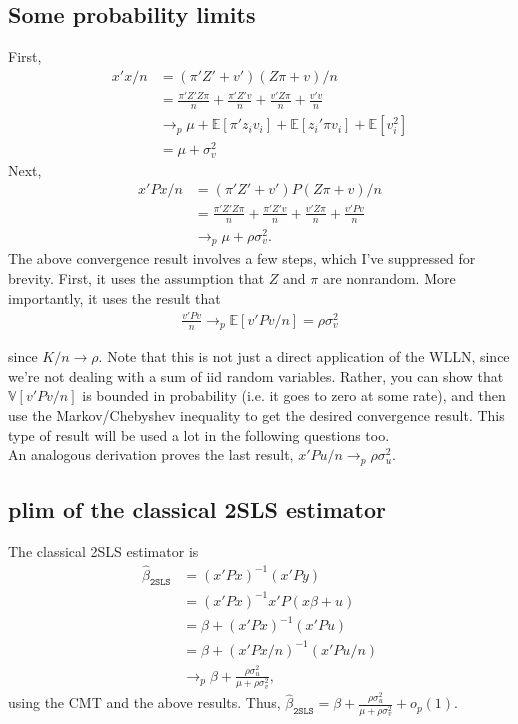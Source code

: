 \documentclass[12pt]{article}
\newcommand{\E}{\mathbb{E}}
\newcommand{\V}{\mathbb{V}}
\newcommand{\mtx}[1]{\ensuremath{\bm{\mathit{#1}}}}
\begin{document}
\subsection{Some probability limits}
First,
\begin{align*}
\mtx{x}'\mtx{x}/n &= (\mtx{\pi}'\mtx{Z}'+\mtx{v}')(\mtx{Z}\mtx{\pi}+\mtx{v})/n\\
&= \frac{\mtx{\pi}'\mtx{Z}'\mtx{Z}\mtx{\pi}}{n} + \frac{\mtx{\pi}'\mtx{Z}'\mtx{v}}{n} + \frac{\mtx{v}'\mtx{Z}\mtx{\pi}}{n} + \frac{\mtx{v}'\mtx{v}}{n}\\
&\to_p \mu + \E[\mtx{\pi}'\mtx{z}_iv_i] + \E[\mtx{z}_i'\mtx{\pi}v_i] + \E[v_i^2]\\
&=\mu + \sigma^2_v
\end{align*}
Next,
\begin{align*}
\mtx{x}'\mtx{P}\mtx{x}/n &= (\mtx{\pi}'\mtx{Z}'+\mtx{v}')\mtx{P}(\mtx{Z}\mtx{\pi}+\mtx{v})/n\\
&=\frac{\mtx{\pi}'\mtx{Z}'\mtx{Z}\mtx{\pi}}{n} + \frac{\mtx{\pi}'\mtx{Z}'\mtx{v}}{n} + \frac{\mtx{v}'\mtx{Z}\mtx{\pi}}{n} + \frac{\mtx{v}'\mtx{P}\mtx{v}}{n}\\
&\to_p \mu + \rho \sigma^2_v.
\end{align*}
The above convergence result involves a few steps, which I've suppressed for brevity. First, it uses the assumption that $\mtx{Z}$ and $\mtx{\pi}$ are nonrandom. More importantly, it uses the result that
\begin{align*}
 \frac{\mtx{v}'\mtx{P}\mtx{v}}{n} \to_p \E[{\mtx{v}'\mtx{P}\mtx{v}}/{n}] = \rho\sigma^2_v
\end{align*} 


since $K/n \to \rho$. Note that this is not just a direct application of the WLLN, since we're not dealing with a sum of iid random variables. Rather, you can show that $\V[{\mtx{v}'\mtx{P}\mtx{v}}/{n}]$ is bounded in probability (i.e. it goes to zero at some rate), and then use the Markov/Chebyshev inequality to get the desired convergence result. This type of result will be used a lot in the following questions too.\\

An analogous derivation proves the last result, $\mtx{x}'\mtx{P}\mtx{u}/n \to_p \rho \sigma^2_u$.

\subsection{plim of the classical 2SLS estimator}
The classical 2SLS estimator is
\begin{align*}
\hat\beta_{\texttt{2SLS}} &= (\mtx{x}'\mtx{P}\mtx{x})^{-1}(\mtx{x}'\mtx{P}\mtx{y})\\
&= (\mtx{x}'\mtx{P}\mtx{x})^{-1}\mtx{x}'\mtx{P}(\mtx{x}\mtx{\beta} + \mtx{u})\\
&= \beta + (\mtx{x}'\mtx{P}\mtx{x})^{-1}(\mtx{x}'\mtx{P}\mtx{u})\\
&= \beta + (\mtx{x}'\mtx{P}\mtx{x}/n)^{-1}(\mtx{x}'\mtx{P}\mtx{u}/n)\\
&\to_p \beta + \frac{\rho\sigma^2_u}{ \mu + \rho \sigma^2_v},
\end{align*}
using the CMT and the above results. Thus, $\hat\beta_{\texttt{2SLS}} = \beta + \frac{\rho\sigma^2_u}{ \mu + \rho \sigma^2_v} + o_p(1)$.
\end{document}
